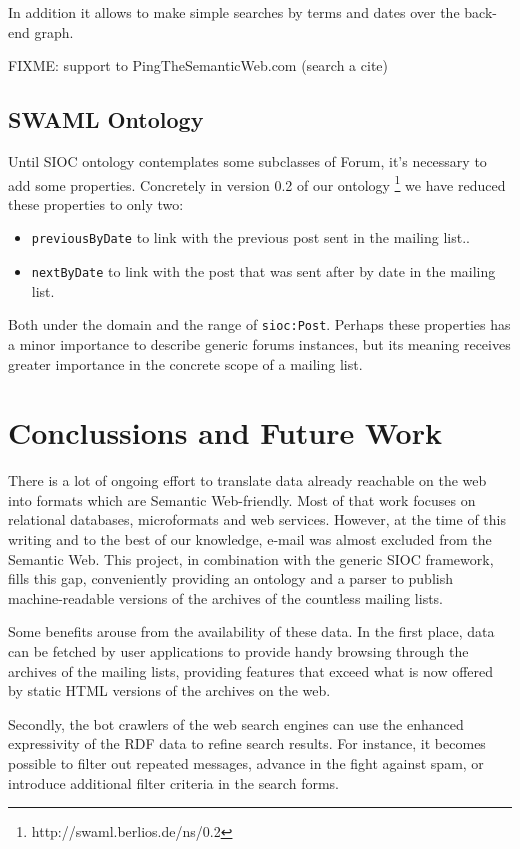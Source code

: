 \documentclass{llncs}
\begin{document}
In addition it allows to make simple searches by terms and dates over the back-end graph.

FIXME: support to PingTheSemanticWeb.com (search a cite)

\subsection{SWAML Ontology}

Until SIOC ontology contemplates some subclasses of Forum, it's necessary 
to add some properties. Concretely in version 0.2 of our ontology 
\footnote{http://swaml.berlios.de/ns/0.2} we have reduced these properties 
to only two:

\begin{itemize}
  \item \texttt{previousByDate} to link with the previous post sent in the 
	mailing list..
  \item \texttt{nextByDate} to link with the post that was sent after by date 
	in the mailing list.
\end{itemize}

Both under the domain and the range of \texttt{sioc:Post}. Perhaps these 
properties has a minor importance to describe generic forums instances, 
but its meaning receives greater importance in the concrete scope of a 
mailing list.

\section{Conclussions and Future Work}

There is a lot of ongoing effort to translate data already reachable
on the web into formats
which are Semantic Web-friendly. Most of that work focuses on relational
databases, microformats and web services. However, at the time of this
writing and to the best of our knowledge, e-mail was almost excluded from the
Semantic Web. This project, in combination with the generic SIOC framework,
fills this gap, conveniently providing
an ontology and a parser to publish machine-readable versions of the
archives of the countless mailing lists.

Some benefits arouse from the availability of these data. In the first
place, data can be fetched by user applications to provide handy browsing
through the archives of the mailing lists, providing features that
exceed what is now offered by static HTML versions of the archives on
the web.

Secondly, the bot crawlers of the web search engines can use the enhanced
expressivity of the RDF data to refine search results. For instance, it
becomes possible to filter out repeated messages, advance in the fight against
spam, or introduce additional filter criteria in the search forms.
\end{document}
